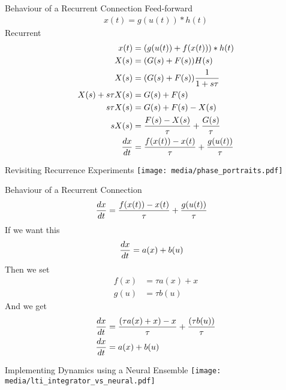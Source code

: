 \documentclass[handout,aspectratio=169]{beamer}
\begin{document}
	\begin{frame}{Behaviour of a Recurrent Connection}
	Feed-forward
			\begin{align*}
				x(t) = g(u(t)) * h(t)				
			\end{align*}		
	Recurrent
			\begin{align*}
	x(t) &= (g(u(t)) + f(x(t))) * h(t)	\\
	X(s) &= (G(s) + F(s))H(s) \\
	X(s) &= (G(s) + F(s)){1 \over {1+s\tau}} \\
	X(s) + s\tau X(s) &= G(s) + F(s) \\
	s\tau X(s) &= G(s) + F(s) - X(s) \\
	sX(s) &= {{F(s) - X(s)} \over \tau} + {G(s) \over \tau} \\
	{dx \over dt} &= {{f(x(t))-x(t)} \over \tau} + {{g(u(t))} \over \tau}
			\end{align*}		
	
	\end{frame}


	\begin{frame}{Revisiting Recurrence Experiments}
		\centering
		\texttt{[image: media/phase\_portraits.pdf]} 		
	\end{frame}

	\begin{frame}{Behaviour of a Recurrent Connection}
	\begin{align*}
		{dx \over dt} &= {{f(x(t))-x(t)} \over \tau} + {{g(u(t))} \over \tau}
	\end{align*}		
	If we want this
	\begin{align*}
	{dx \over dt} &= a(x) + b(u)
	\end{align*}
	Then we set
	\begin{align*}
	f(x) &= \tau a(x) + x \\
	g(u) &= \tau b(u)
	\end{align*}
	And we get
	\begin{align*}
	{dx \over dt} &= {{(\tau a(x) + x) - x} \over \tau} + {{(\tau b(u))} \over \tau} \\
	{dx \over dt} &= {{a(x)}} + {{b(u)}}
	\end{align*}		
	
	
			
	
	
\end{frame}


	\begin{frame}{Implementing Dynamics using a Neural Ensemble}
		\centering
		\texttt{[image: media/lti\_integrator\_vs\_neural.pdf]} 
	\end{frame}
\end{document}
